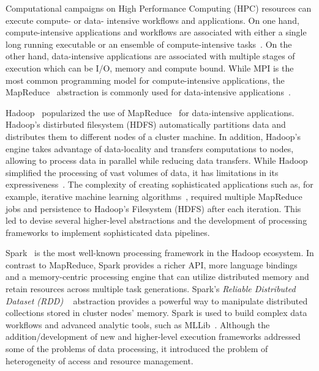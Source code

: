 \label{ch:pilot-data-hadoop}

Computational campaigns on High Performance Computing (HPC) resources can
execute compute- or data- intensive workflows and applications. On one hand,
compute-intensive applications and workflows are associated with either a single
long running executable or an ensemble of compute-intensive
tasks~\cite{balasubramanian2018harnessing}. On the other hand, data-intensive
applications are associated with multiple stages of execution which can be I/O,
memory and compute bound. While MPI is the most common programming model for
compute-intensive applications, the MapReduce~\cite{dean2004mapreduce}
abstraction is commonly used for data-intensive
applications~\cite{hellerstein2012science}.


Hadoop~\cite{hadoop} popularized the use of MapReduce~\cite{dean2004mapreduce}
for data-intensive applications. Hadoop's distirbuted filesystem (HDFS)
automatically partitions data and distributes them to different nodes of a
cluster machine. In addition, Hadoop's engine takes advantage of data-locality
and transfers computations to nodes, allowing to process data in parallel while
reducing data transfers. While Hadoop simplified the processing of vast volumes
of data, it has limitations in its
expressiveness~\cite{yelick2011magellan,isard2007dryad}. The complexity of
creating sophisticated applications such as, for example, iterative machine
learning algorithms~\cite{grolinger2014challenges}, required multiple MapReduce
jobs and persistence to Hadoop's Filesystem (HDFS) after each iteration. This
led to devise several higher-level abstractions and the development of
processing frameworks to implement sophisticated data pipelines.

Spark~\cite{zaharia2010spark} is the most well-known processing framework in the
Hadoop ecosystem. In contrast to MapReduce, Spark provides a richer API, more
language bindings and a memory-centric processing engine that can utilize
distributed memory and retain resources across multiple task generations.
Spark's \emph{Reliable Distributed Dataset (RDD)} ~\cite{zaharia2012resilient}
abstraction provides a powerful way to manipulate distributed collections stored
in cluster nodes' memory. Spark is used to build complex data workflows and
advanced analytic tools, such as MLLib~\cite{mllib}. Although the
addition/development of new and higher-level execution frameworks addressed some
of the problems of data processing, it introduced the problem of heterogeneity
of access and resource management.

